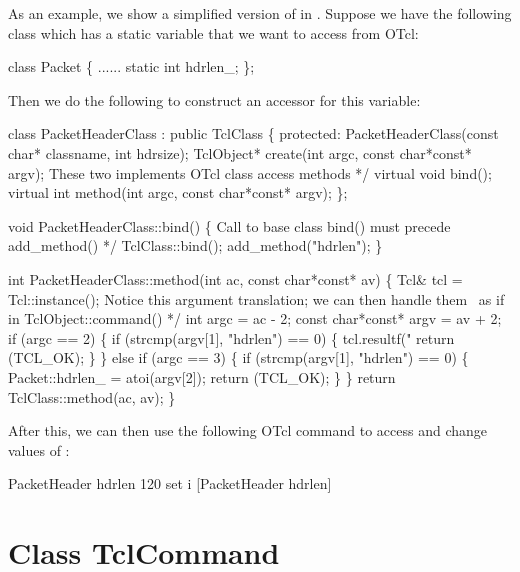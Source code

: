 As an example, we show a simplified version of
 in . 
Suppose we have the following class  which has a static
variable  that we want to access from OTcl:
\begin{program}
class Packet \{
        ......
        static int hdrlen_;
\};
\end{program}
Then we do the following to construct an accessor for this variable:
\begin{program}
class PacketHeaderClass : public TclClass \{
protected:
        PacketHeaderClass(const char* classname, int hdrsize);
        TclObject* create(int argc, const char*const* argv);
        \* These two implements OTcl class access methods */
        virtual void bind();
        virtual int method(int argc, const char*const* argv);
\};

void PacketHeaderClass::bind()
\{
        \* Call to base class bind() must precede add_method() */
        TclClass::bind();
        add_method("hdrlen");
\}

int PacketHeaderClass::method(int ac, const char*const* av)
\{
        Tcl& tcl = Tcl::instance();
        \* Notice this argument translation; we can then handle them \
as if in TclObject::command() */
        int argc = ac - 2;
        const char*const* argv = av + 2;
        if (argc == 2) \{
                if (strcmp(argv[1], "hdrlen") == 0) \{
                        tcl.resultf("%
                        return (TCL_OK);
                \}
        \} else if (argc == 3) \{
                if (strcmp(argv[1], "hdrlen") == 0) \{
                        Packet::hdrlen_ = atoi(argv[2]);
                        return (TCL_OK);
                \}
        \}
        return TclClass::method(ac, av);
\}
\end{program}
After this, we can then use the following OTcl command to access and
change values of \code{Packet::hdrlen_}:
\begin{program}
        PacketHeader hdrlen 120
        set i [PacketHeader hdrlen]
\end{program}

\section{Class TclCommand}
\label{sec:TclCommand}

